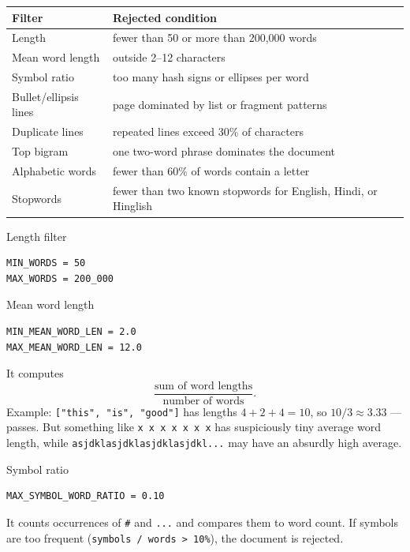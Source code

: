 \begin{center}
  \renewcommand{\arraystretch}{1.15}
  \small
  \begin{tabular}{@{}p{}p{}@{}}
    \textbf{Filter} & \textbf{Rejected condition} \\
    \hline
    Length & fewer than 50 or more than 200{,}000 words \\
    Mean word length & outside 2--12 characters \\
    Symbol ratio & too many hash signs or ellipses per word \\
    Bullet/ellipsis lines & page dominated by list or fragment patterns \\
    Duplicate lines & repeated lines exceed 30\% of characters \\
    Top bigram & one two-word phrase dominates the document \\
    Alphabetic words & fewer than 60\% of words contain a letter \\
    Stopwords & fewer than two known stopwords for English, Hindi, or Hinglish
  \end{tabular}
\end{center}

\begin{paragraphblock}{Length filter}
\begin{lstlisting}[style=shadedpython]
MIN_WORDS = 50
MAX_WORDS = 200_000
\end{lstlisting}
\end{paragraphblock}

\begin{paragraphblock}{Mean word length}
\begin{lstlisting}[style=shadedpython]
MIN_MEAN_WORD_LEN = 2.0
MAX_MEAN_WORD_LEN = 12.0
\end{lstlisting}
  It computes
  \[
    \frac{\text{sum of word lengths}}{\text{number of words}}.
  \]
  Example: \texttt{["this", "is", "good"]} has lengths $4+2+4=10$, so
  $10/3\approx 3.33$ --- passes. But something like \texttt{x x x x x x x}
  has suspiciously tiny average word length, while
  \texttt{asjdklasjdklasjdklasjdkl...} may have an absurdly high average.
\end{paragraphblock}

\begin{paragraphblock}{Symbol ratio}
\begin{lstlisting}[style=shadedpython]
MAX_SYMBOL_WORD_RATIO = 0.10
\end{lstlisting}
  It counts occurrences of \texttt{\#} and \texttt{...} and compares them to
  word count. If symbols are too frequent (\texttt{symbols / words > 10\%}),
  the document is rejected.
\end{paragraphblock}


